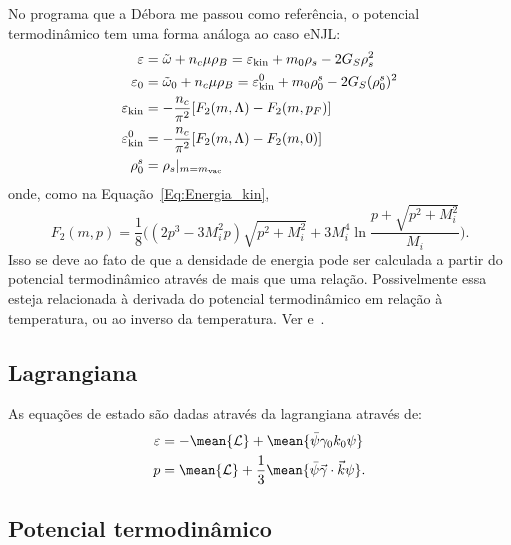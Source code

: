 No programa que a Débora me passou como referência, o potencial termodinâmico tem uma forma análoga ao caso eNJL:
\begin{subequations}\label{Eq:Pot_termodinamico_2}
\begin{align}
	\varepsilon &= \tilde{\omega} + n_c\mu\rho_B = \varepsilon_{\rm{kin}} + m_0\rho_s - 2G_S\rho_s^2 \\
	\varepsilon_0 &= \tilde{\omega}_0 + n_c\mu\rho_B = \varepsilon_{\rm{kin}}^0 + m_0\rho_0^s - 2G_S(\rho_0^s)^2 \\
	\varepsilon_{\rm{kin}} &= -\frac{n_c}{\pi^2} [F_2(m, \Lambda) - F_2(m, p_F)] \\
	\varepsilon_{\rm{kin}}^0 &= -\frac{n_c}{\pi^2} [F_2(m, \Lambda) - F_2(m, 0)] \\
	\rho_0^s &= \rho_s|_{m = m_{\rm{vac}}}
\end{align}
\end{subequations}
%
onde, como na Equação~\eqref{Eq:Energia_kin},
\begin{equation}
	F_2(m, p) = \frac{1}{8}\Big((2p^3 - 3M_i^2p)\sqrt{p^2 + M_i^2} + 3M_i^4\ln\frac{p + \sqrt{p^2 + M_i^2}}{M_i}\Big).
\end{equation}
%
Isso se deve ao fato de que a densidade de energia pode ser calculada a partir do potencial termodinâmico através de mais que uma relação. Possivelmente essa esteja relacionada à derivada do potencial termodinâmico em relação à temperatura, ou ao inverso da temperatura. Ver \parencite{Avancini2004} e~\parencite{Avancini2006}.

\subsection{Lagrangiana}

As equações de estado são dadas através da lagrangiana através de\parencite{Glendenning1983}:
\begin{align}
	\varepsilon &= -\mean{\mathcal{L}} + \mean{\bar\psi\gamma_0k_0\psi} \\
	p &= \mean{\mathcal{L}} + \frac{1}{3} \mean{\bar\psi\vec{\gamma}\cdot\vec{k}\psi}.
\end{align}

\subsection{Potencial termodinâmico}

